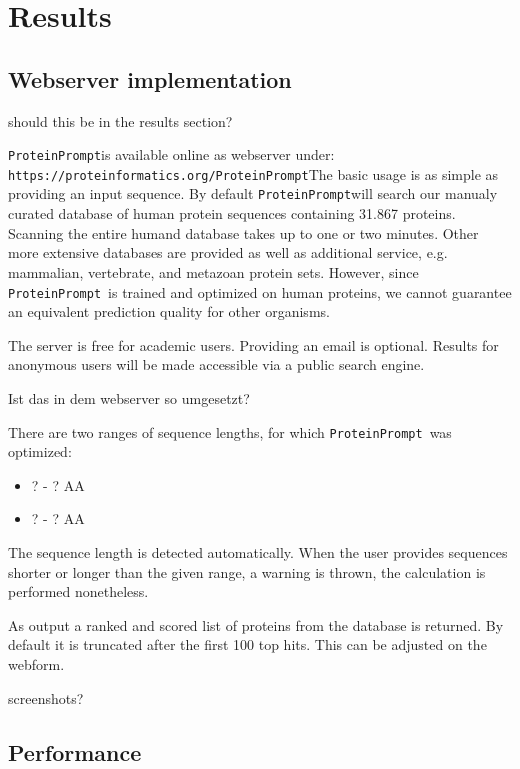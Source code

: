 \documentclass[preprint,3p,times,twocolumn]{elsarticle}
\newcommand{\TODO}[1] {\begingroup\color{red}#1\endgroup}
\newcommand{\url}[1]{\texttt{https://\small #1}}
\newcommand{\tool}{\texttt{ProteinPrompt}\hspace{2pt}}
\newcommand{\website}{\url{proteinformatics.org/\tool}}
\begin{document}

\section{Results}

\subsection{Webserver implementation}
\TODO{should this be in the results section?}

\tool is available online as webserver under: \website The basic usage
is as simple as providing an input sequence. By default \tool will
search our manualy curated database of human protein sequences
containing 31.867 proteins. Scanning the entire humand database takes
up to one or two minutes. Other more extensive databases are provided
as well as additional service, e.g. mammalian, vertebrate, and
metazoan protein sets. However, since \tool\ is trained and optimized
on human proteins, we cannot guarantee an equivalent prediction
quality for other organisms. 

The server is free for academic users. Providing an email is
optional. Results for anonymous users will be made accessible via a
public search engine. 

\TODO{Ist das in dem webserver so umgesetzt?

There are two ranges of sequence lengths, for which \tool\ was
optimized: 
\begin{itemize}
\item \TODO{? - ?} AA
\item \TODO{? - ?} AA
\end{itemize}
}

The sequence length is detected automatically. When the user provides
sequences shorter or longer than the given range, a warning is thrown,
the calculation is performed nonetheless.

As output a ranked and scored list of proteins from the database is
returned. By default it is truncated after the first 100 top
hits. This can be adjusted on the webform. 

\TODO{ screenshots?}

\subsection{Performance}
\label{performance}
\end{document}
